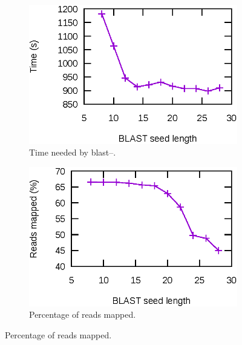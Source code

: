 \begin{figure}
    \begin{subfigure}[b]{0.5\textwidth}
        \includegraphics{img/time}
        \caption{Time needed by \acrshort{blast}--\blastobam{}.}\label{fig:time}
    \end{subfigure}
    \hfill
    \begin{subfigure}[b]{0.5\textwidth}
        \includegraphics{img/nbReads}
        \caption{Percentage of reads mapped.}\label{fig:nbReads}
    \end{subfigure}
    \smallskip
    

\end{figure}
